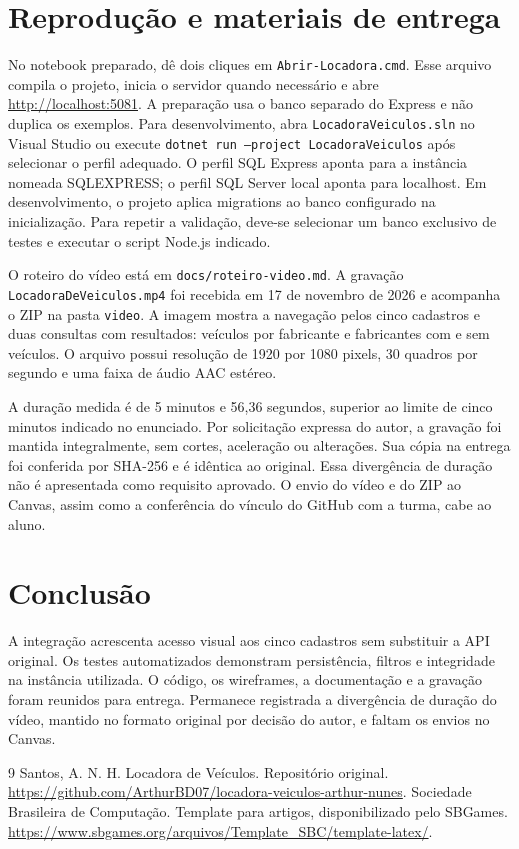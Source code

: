 \documentclass[12pt]{article}
\begin{document}
\section{Reprodução e materiais de entrega}
No notebook preparado, dê dois cliques em \texttt{Abrir-Locadora.cmd}. Esse arquivo compila o projeto, inicia o servidor quando necessário e abre \url{http://localhost:5081}. A preparação usa o banco separado do Express e não duplica os exemplos. Para desenvolvimento, abra \texttt{LocadoraVeiculos.sln} no Visual Studio ou execute \texttt{dotnet run --project LocadoraVeiculos} após selecionar o perfil adequado. O perfil SQL Express aponta para a instância nomeada SQLEXPRESS; o perfil SQL Server local aponta para localhost. Em desenvolvimento, o projeto aplica migrations ao banco configurado na inicialização. Para repetir a validação, deve-se selecionar um banco exclusivo de testes e executar o script Node.js indicado.

O roteiro do vídeo está em \texttt{docs/roteiro-video.md}. A gravação \texttt{LocadoraDeVeiculos.mp4} foi recebida em 17 de novembro de 2026 e acompanha o ZIP na pasta \texttt{video}. A imagem mostra a navegação pelos cinco cadastros e duas consultas com resultados: veículos por fabricante e fabricantes com e sem veículos. O arquivo possui resolução de 1920 por 1080 pixels, 30 quadros por segundo e uma faixa de áudio AAC estéreo.

A duração medida é de 5 minutos e 56,36 segundos, superior ao limite de cinco minutos indicado no enunciado. Por solicitação expressa do autor, a gravação foi mantida integralmente, sem cortes, aceleração ou alterações. Sua cópia na entrega foi conferida por SHA-256 e é idêntica ao original. Essa divergência de duração não é apresentada como requisito aprovado. O envio do vídeo e do ZIP ao Canvas, assim como a conferência do vínculo do GitHub com a turma, cabe ao aluno.
\section{Conclusão}
A integração acrescenta acesso visual aos cinco cadastros sem substituir a API original. Os testes automatizados demonstram persistência, filtros e integridade na instância utilizada. O código, os wireframes, a documentação e a gravação foram reunidos para entrega. Permanece registrada a divergência de duração do vídeo, mantido no formato original por decisão do autor, e faltam os envios no Canvas.
\begin{thebibliography}{9}
 Santos, A. N. H. Locadora de Veículos. Repositório original. \url{https://github.com/ArthurBD07/locadora-veiculos-arthur-nunes}.
 Sociedade Brasileira de Computação. Template para artigos, disponibilizado pelo SBGames. \url{https://www.sbgames.org/arquivos/Template_SBC/template-latex/}.
\end{thebibliography}
\end{document}
